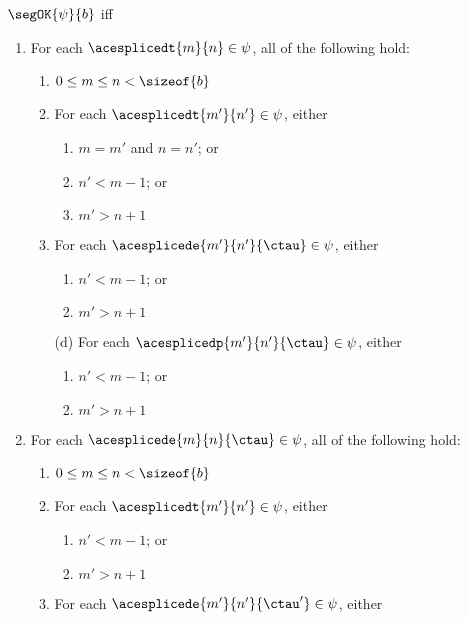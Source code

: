 \begin{definition} $\segOK{\psi}{b}$ iff 
\begin{enumerate}
  \item For each $\acesplicedt{m}{n} \in \psi$, all of the following hold:
    \begin{enumerate}
      \item $0 \leq m \leq n < \sizeof{b}$
      \item For each $\acesplicedt{m'}{n'} \in \psi$, either 
        \begin{enumerate}
          \item $m=m'$ and $n=n'$; or 
          \item $n' < m - 1$; or 
          \item $m' > n + 1$
        \end{enumerate}
      \item For each $\acesplicede{m'}{n'}{\ctau} \in \psi$, either 
        \begin{enumerate}
          \item $n' < m - 1$; or 
          \item $m' > n + 1$
        \end{enumerate}
    \end{enumerate}
    \begin{grayparbox}
    \begin{enumerate}
      \item[(d)] For each $\acesplicedp{m'}{n'}{\ctau} \in \psi$, either 
        \begin{enumerate}
          \item $n' < m - 1$; or
          \item $m' > n + 1$
        \end{enumerate}
    \end{enumerate}
    \end{grayparbox}
  \item For each $\acesplicede{m}{n}{\ctau} \in \psi$, all of the following hold:
    \begin{enumerate}
      \item $0 \leq m \leq n < \sizeof{b}$
      \item For each $\acesplicedt{m'}{n'} \in \psi$, either 
        \begin{enumerate}
          \item $n' < m - 1$; or 
          \item $m' > n + 1$
        \end{enumerate}
      \item For each $\acesplicede{m'}{n'}{\ctau'} \in \psi$, either 

\end{enumerate}
\end{enumerate}
\end{definition}
